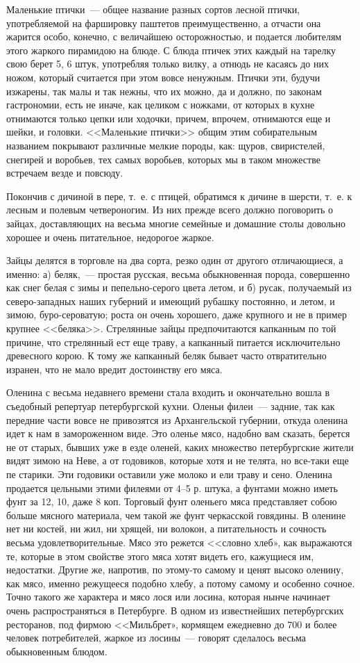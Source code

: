 Маленькие птички~--- общее название разных сортов лесной птички, употребляемой на фаршировку паштетов преимущественно, а отчасти она жарится особо, конечно, с величайшею осторожностью, и подается любителям этого жаркого пирамидою на блюде. С блюда птичек этих каждый на тарелку свою берет 5, 6 штук, употребляя только вилку, а отнюдь не касаясь до них ножом, который считается при этом вовсе ненужным. Птички эти, будучи изжарены, так малы и так нежны, что их можно, да и должно, по законам гастрономии, есть не иначе, как целиком с ножками, от которых в кухне отнимаются только цепки или ходочки, причем, впрочем, отнимаются еще и шейки, и головки. <<Маленькие птички>> общим этим собирательным названием покрывают различные мелкие породы, как: щуров, свиристелей, снегирей и воробьев, тех самых воробьев, которых мы в таком множестве встречаем везде и повсюду.

Покончив с дичиной в пере, т.~е. с птицей, обратимся к дичине в шерсти, т.~е. к лесным и полевым четвероногим. Из них прежде всего должно поговорить о зайцах, доставляющих на весьма многие семейные и домашние столы довольно хорошее и очень питательное, недорогое жаркое.

Зайцы делятся в торговле на два сорта, резко один от другого отличающиеся, а именно: а) беляк,~--- простая русская, весьма обыкновенная порода, совершенно как снег белая с зимы и пепельно-серого цвета летом, и б) русак, получаемый из северо-западных наших губерний и имеющий рубашку постоянно, и летом, и зимою, буро-сероватую; роста он очень хорошего, даже крупного и не в пример крупнее <<беляка>>. Стрелянные зайцы предпочитаются капканным по той причине, что стрелянный ест еще траву, а капканный питается исключительно древесного корою. К тому же капканный беляк бывает часто отвратительно изранен, что не мало вредит достоинству его мяса.

Оленина с весьма недавнего времени стала входить и окончательно вошла в съедобный репертуар петербургской кухни. Оленьи филеи~--- задние, так как передние части вовсе не привозятся из Архангельской губернии, откуда оленина идет к нам в замороженном виде. Это оленье мясо, надобно вам сказать, берется не от старых, бывших уже в езде оленей, каких множество петербургские жители видят зимою на Неве, а от годовиков, которые хотя и не телята, но все-таки еще пе старики. Эти годовики оставили уже молоко и ели траву и сено. Оленина продается цельными этими филеями от 4–5 р. штука, а фунтами можно иметь фунт за 12, 10, даже 8 коп. Торговый фунт оленьего мяса представляет собою больше мясного материала, чем такой же фунт черкасской говядины. В оленине нет ни костей, ни жил, ни хрящей, ни волокон, а питательность и сочность весьма удовлетворительные. Мясо это режется <<словно хлеб», как выражаются те, которые в этом свойстве этого мяса хотят видеть его, кажущиеся им, недостатки. Другие же, напротив, по этому-то самому и ценят высоко оленину, как мясо, именно режущееся подобно хлебу, а потому самому и особенно сочное. Точно такого же характера и мясо лося или лосина, которая нынче начинает очень распространяться в Петербурге. В одном из известнейших петербургских ресторанов, под фирмою <<Мильбрет», кормящем ежедневно до 700 и более человек потребителей, жаркое из лосины~--- говорят сделалось весьма обыкновенным блюдом.

